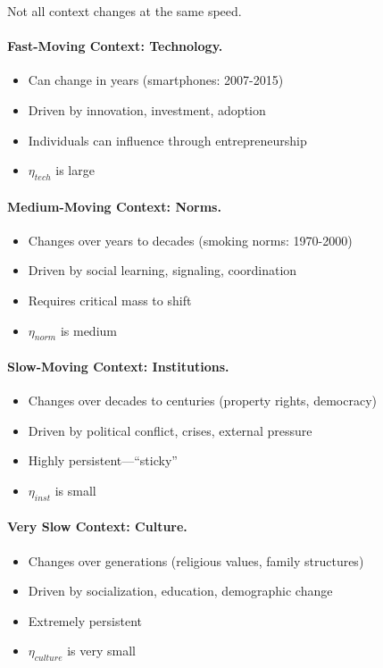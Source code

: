 \documentclass[12pt,a4paper]{article}
\begin{document}
Not all context changes at the same speed.

\paragraph{Fast-Moving Context: Technology.}
\begin{itemize}
  \item Can change in years (smartphones: 2007-2015)
  \item Driven by innovation, investment, adoption
  \item Individuals can influence through entrepreneurship
  \item $\eta_{tech}$ is large
\end{itemize}

\paragraph{Medium-Moving Context: Norms.}
\begin{itemize}
  \item Changes over years to decades (smoking norms: 1970-2000)
  \item Driven by social learning, signaling, coordination
  \item Requires critical mass to shift
  \item $\eta_{norm}$ is medium
\end{itemize}

\paragraph{Slow-Moving Context: Institutions.}
\begin{itemize}
  \item Changes over decades to centuries (property rights, democracy)
  \item Driven by political conflict, crises, external pressure
  \item Highly persistent---``sticky''
  \item $\eta_{inst}$ is small
\end{itemize}

\paragraph{Very Slow Context: Culture.}
\begin{itemize}
  \item Changes over generations (religious values, family structures)
  \item Driven by socialization, education, demographic change
  \item Extremely persistent
  \item $\eta_{culture}$ is very small
\end{itemize}
\end{document}

